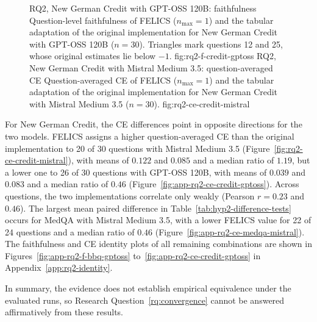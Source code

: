 \begin{figure}[htb]
  \centering
    {RQ2, New German Credit with GPT-OSS 120B: faithfulness}%
    {Question-level faithfulness of FELICS ($n_{\max}=1$) and the tabular adaptation of the original implementation for New German Credit with GPT-OSS 120B ($n=30$). Triangles mark questions 12 and 25, whose original estimates lie below $-1$.}%
    {fig:rq2-f-credit-gptoss}%
  \hfill
    {RQ2, New German Credit with Mistral Medium 3.5: question-averaged CE}%
    {Question-averaged CE of FELICS ($n_{\max}=1$) and the tabular adaptation of the original implementation for New German Credit with Mistral Medium 3.5 ($n=30$).}%
    {fig:rq2-ce-credit-mistral}%
\end{figure}

For New German Credit, the CE differences point in opposite directions for the two models. FELICS assigns a higher question-averaged CE than the original implementation to 20 of 30 questions with Mistral Medium 3.5 (Figure~\ref{fig:rq2-ce-credit-mistral}), with means of $0.122$ and $0.085$ and a median ratio of $1.19$, but a lower one to 26 of 30 questions with GPT-OSS 120B, with means of $0.039$ and $0.083$ and a median ratio of $0.46$ (Figure~\ref{fig:app-rq2-ce-credit-gptoss}). Across questions, the two implementations correlate only weakly (Pearson $r=0.23$ and $0.46$). The largest mean paired difference in Table~\ref{tab:hyp2-difference-tests} occurs for MedQA with Mistral Medium 3.5, with a lower FELICS value for 22 of 24 questions and a median ratio of $0.46$ (Figure~\ref{fig:app-rq2-ce-medqa-mistral}). The faithfulness and CE identity plots of all remaining combinations are shown in Figures~\ref{fig:app-rq2-f-bbq-gptoss} to~\ref{fig:app-rq2-ce-credit-gptoss} in Appendix~\ref{app:rq2-identity}.

In summary, the evidence does not establish empirical equivalence under the evaluated runs, so Research Question~\ref{rq:convergence} cannot be answered affirmatively from these results.
